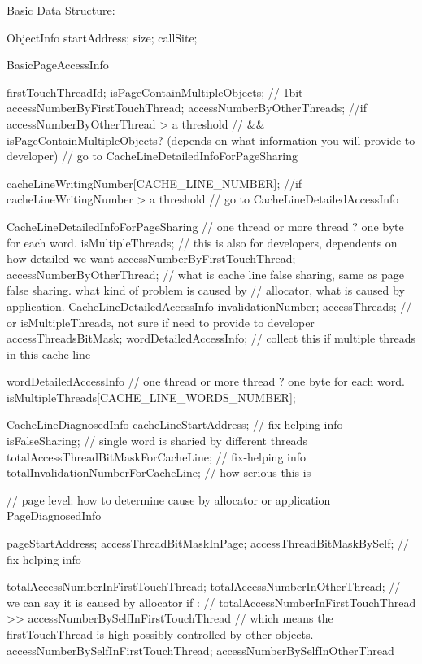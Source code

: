 Basic Data Structure:

        ObjectInfo {
            startAddress;
            size;
            callSite;
        }

        BasicPageAccessInfo {
            firstTouchThreadId;
            isPageContainMultipleObjects;  // 1bit
            accessNumberByFirstTouchThread;
            accessNumberByOtherThreads;
            //if accessNumberByOtherThread > a threshold
            //  && isPageContainMultipleObjects? (depends on what information you will provide to developer)
            //       go to CacheLineDetailedInfoForPageSharing

            cacheLineWritingNumber[CACHE_LINE_NUMBER];
            //if cacheLineWritingNumber > a threshold
            //      go to CacheLineDetailedAccessInfo
        }

        CacheLineDetailedInfoForPageSharing {
            // one thread or more thread ? one byte for each word.
            isMultipleThreads; // this is also for developers, dependents on how detailed we want
            accessNumberByFirstTouchThread;
            accessNumberByOtherThread;
        }
        // what is cache line false sharing, same as page false sharing. what kind of problem is caused by
        // allocator, what is caused by application.
        CacheLineDetailedAccessInfo {
            invalidationNumber;
            accessThreads;  // or isMultipleThreads, not sure if need to provide to developer
            accessThreadsBitMask;
            wordDetailedAccessInfo;  // collect this if multiple threads in this cache line
        }

        wordDetailedAccessInfo {
            // one thread or more thread ? one byte for each word.
            isMultipleThreads[CACHE_LINE_WORDS_NUMBER];
        }

        CacheLineDiagnosedInfo {
            cacheLineStartAddress;  // fix-helping info
            isFalseSharing;  // single word is sharied by different threads
            totalAccessThreadBitMaskForCacheLine;   // fix-helping info
            totalInvalidationNumberForCacheLine;  // how serious this is
        }

// page level: how to determine cause by allocator or application
        PageDiagnosedInfo {
            pageStartAddress;
            accessThreadBitMaskInPage;
            accessThreadBitMaskBySelf; // fix-helping info

            totalAccessNumberInFirstTouchThread;
            totalAccessNumberInOtherThread;
            // we can say it is caused by allocator if :
            // totalAccessNumberInFirstTouchThread >> accessNumberBySelfInFirstTouchThread
            // which means the firstTouchThread is high possibly controlled by other objects.
            accessNumberBySelfInFirstTouchThread;
            accessNumberBySelfInOtherThread
        }

